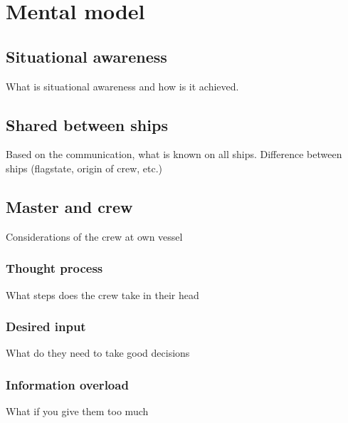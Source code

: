 \chapter{Mental model}

\section{Situational awareness}
What is situational awareness and how is it achieved.

\section{Shared between ships}
Based on the communication, what is known on all ships.
Difference between ships (flagstate, origin of crew, etc.)

\section{Master and crew}
Considerations of the crew at own vessel

\subsection{Thought process}
What steps does the crew take in their head

\subsection{Desired input}
What do they need to take good decisions

\subsection{Information overload}
What if you give them too much




